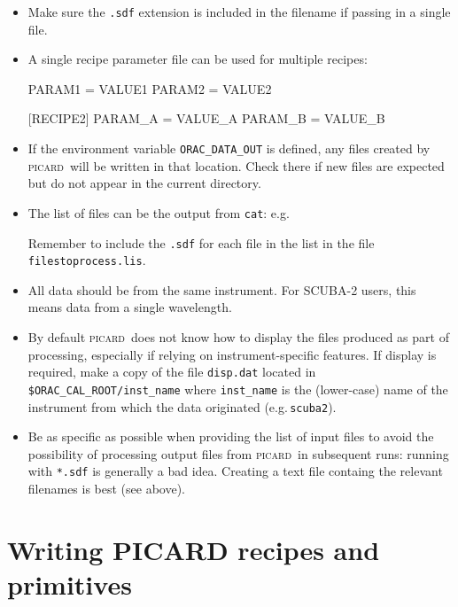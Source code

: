 \documentclass[twoside,11pt,nolof]{starlink}
\providecommand{\picard}{\textsc{picard}}
\begin{document}
\begin{itemize}

\item
Make sure the \verb+.sdf+ extension is included in the filename if
passing in a single file.

\item A single recipe parameter file can be used for multiple recipes:
\begin{terminalv}
[RECIPE1]
PARAM1 = VALUE1
PARAM2 = VALUE2

[RECIPE2]
PARAM_A = VALUE_A
PARAM_B = VALUE_B
\end{terminalv}

\item If the environment variable \verb+ORAC_DATA_OUT+ is defined, any
  files created by \picard\ will be written in that location. Check
  there if new files are expected but do not appear in the current
  directory.

\item The list of files can be the output from \texttt{cat}: e.g.\
\begin{terminalv}
\end{terminalv}
Remember to include the \verb+.sdf+ for each file in the list in the
file \verb+filestoprocess.lis+.

\item All data should be from the same instrument. For SCUBA-2 users,
  this means data from a single wavelength.

\item By default \picard\ does not know how to display the files
  produced as part of processing, especially if relying on
  instrument-specific features. If display is required, make a copy of
  the file \texttt{disp.dat} located in
  \verb+$ORAC_CAL_ROOT/inst_name+ where \verb+inst_name+ is the
  (lower-case) name of the instrument from which the data originated
  (e.g.\,\verb+scuba2+).

\item Be as specific as possible when providing the list of input
  files to avoid the possibility of processing output files from
  \picard\ in subsequent runs: running with \verb+*.sdf+ is generally
  a bad idea. Creating a text file containg the relevant filenames is
  best (see above).

\end{itemize}

\section{Writing PICARD recipes and primitives\label{se:write}}
\end{document}
